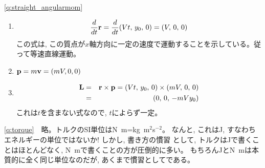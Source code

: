 \ref{q:straight_angularmom}
\begin{enumerate}
\item 
\begin{eqnarray*}\frac{d}{dt}{\bf r}=\frac{d}{dt}(Vt,\, y_0,\, 0)=(V,\, 0,\, 0)\end{eqnarray*}
この式は, この質点が$x$軸方向に一定の速度で運動することを示している。従って等速直線運動。
\item ${\bf p}=m{\bf v}=(mV, 0, 0)$
\item 
\begin{eqnarray*}
{\bf L}&=&{\bf r}\times{\bf p}=(Vt,\, y_0,\, 0)\times(mV,\, 0,\, 0)\\
       &=&(0,\, 0,\, -mVy_0)
\end{eqnarray*}
これは$t$を含まない式なので, $t$によらず一定。
\end{enumerate}
\vspace{0.2cm}

\ref{q:torque}　略。トルクのSI単位はN~m=kg~m$^2$s$^{-2}$。
なんと, これはJ, すなわちエネルギーの単位ではないか! しかし, 書き方の慣習
として, トルクはJで書くことはほとんどなく, N~mで書くことの方が圧倒的に多い。
もちろんJとN~mは本質的に全く同じ単位なのだが, あくまで慣習としてである。
\vspace{0.2cm}

